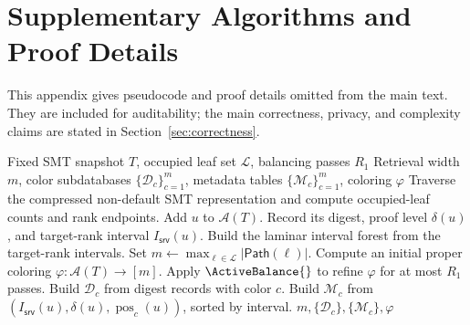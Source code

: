 \appendices

\section{Supplementary Algorithms and Proof Details}
\label{app:proofs}

This appendix gives pseudocode and proof details omitted from the main text. They are included for auditability; the main correctness, privacy, and complexity claims are stated in Section~\ref{sec:correctness}.

\setcounter{algorithm}{0}
\renewcommand{\thealgorithm}{A.\arabic{algorithm}}

\begin{algorithm}[H]
\caption{Offline preprocessing}
\label{alg:app_setup}
\footnotesize
\begin{algorithmic}[1]
\Require Fixed SMT snapshot \(T\), occupied leaf set \(\mathcal{L}\), balancing passes \(R_1\)
\Ensure Retrieval width \(m\), color subdatabases \(\{\mathcal{D}_c\}_{c=1}^{m}\), metadata tables \(\{\mathcal{M}_c\}_{c=1}^{m}\), coloring \(\varphi\)
\State Traverse the compressed non-default SMT representation and compute occupied-leaf counts and rank endpoints.
        \State Add \(u\) to \(\mathcal{A}(T)\).
        \State Record its digest, proof level \(\delta(u)\), and target-rank interval \(I_{\mathsf{srv}}(u)\).
    \EndIf
\EndFor
\State Build the laminar interval forest from the target-rank intervals.
\State Set \(m\gets \max_{\ell\in\mathcal{L}}|\mathsf{Path}(\ell)|\).
\State Compute an initial proper coloring \(\varphi:\mathcal{A}(T)\rightarrow[m]\).
\State Apply \(\ActiveBalance{}\) to refine \(\varphi\) for at most \(R_1\) passes.
    \State Build \(\mathcal{D}_c\) from digest records with color \(c\).
    \State Build \(\mathcal{M}_c\) from \((I_{\mathsf{srv}}(u),\delta(u),\operatorname{pos}_c(u))\), sorted by interval.
\EndFor
\State \Return \(m,\{\mathcal{D}_c\},\{\mathcal{M}_c\},\varphi\)
\end{algorithmic}
\end{algorithm}

